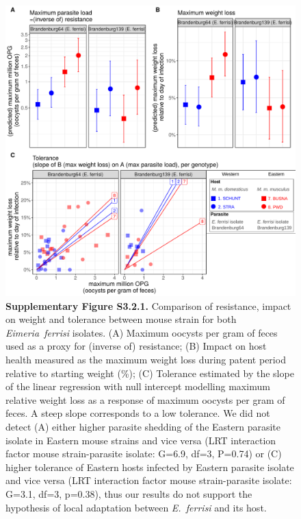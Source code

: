 \begin{figure}[H]
	\centering
	\includegraphics[width=\linewidth,height=\textheight,keepaspectratio]{images/3article2/SupplS2_Fig3.pdf}
	\captionsetup{labelformat=empty}
	\caption{\textbf{Supplementary Figure S3.2.1.} Comparison of resistance, impact on weight and tolerance between mouse strain for both \textit{Eimeria~ferrisi} isolates. (A) Maximum oocysts per gram of feces used as a proxy for (inverse of) resistance; (B) Impact on host health measured as the maximum weight loss during patent period relative to starting weight (\%); (C) Tolerance estimated by the slope of the linear regression with null intercept modelling maximum relative weight loss as a response of maximum oocysts per gram of feces. A steep slope corresponds to a low tolerance.
We did not detect (A) either higher parasite shedding of the Eastern parasite isolate in Eastern mouse strains and vice versa (LRT interaction factor mouse strain-parasite isolate: G=6.9, df=3, P=0.74) or (C) higher tolerance of Eastern hosts infected by Eastern parasite isolate and vice versa (LRT interaction factor mouse strain-parasite isolate: G=3.1, df=3, p=0.38), thus our results do not support the hypothesis of local adaptation between \textit{E.~ferrisi} and its host. }
\end{figure}

